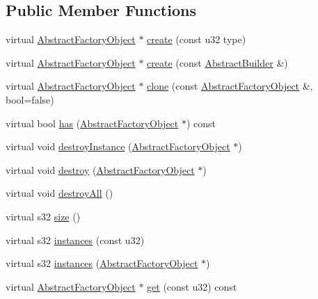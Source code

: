 \subsection*{Public Member Functions}
\begin{DoxyCompactItemize}
\item 
virtual \hyperlink{classjli_1_1_abstract_factory_object}{Abstract\+Factory\+Object} $\ast$ \hyperlink{classjli_1_1_world_factory_ae84dad80ebffaf34cdc7fe95d1e7a66e}{create} (const u32 type)
\item 
virtual \hyperlink{classjli_1_1_abstract_factory_object}{Abstract\+Factory\+Object} $\ast$ \hyperlink{classjli_1_1_world_factory_a7907b82e19f4bbb1f5c98fbceaf7d961}{create} (const \hyperlink{classjli_1_1_abstract_builder}{Abstract\+Builder} \&)
\item 
virtual \hyperlink{classjli_1_1_abstract_factory_object}{Abstract\+Factory\+Object} $\ast$ \hyperlink{classjli_1_1_world_factory_aadc177f52ddc2a0d53259ea99fbf90df}{clone} (const \hyperlink{classjli_1_1_abstract_factory_object}{Abstract\+Factory\+Object} \&, bool=false)
\item 
virtual bool \hyperlink{classjli_1_1_world_factory_a29af5f1c2a8f5e57c0dc4e9764715797}{has} (\hyperlink{classjli_1_1_abstract_factory_object}{Abstract\+Factory\+Object} $\ast$) const 
\item 
virtual void \hyperlink{classjli_1_1_world_factory_a715756195f93bfec6f6c54640e5e09e5}{destroy\+Instance} (\hyperlink{classjli_1_1_abstract_factory_object}{Abstract\+Factory\+Object} $\ast$)
\item 
virtual void \hyperlink{classjli_1_1_world_factory_ac40ef526c98ded68e2be556995147ca5}{destroy} (\hyperlink{classjli_1_1_abstract_factory_object}{Abstract\+Factory\+Object} $\ast$)
\item 
virtual void \hyperlink{classjli_1_1_world_factory_a17880329ad38799467c11830c8b2b39e}{destroy\+All} ()
\item 
virtual s32 \hyperlink{classjli_1_1_world_factory_a56279adb8ce6f7072739a5b7eeccd45b}{size} ()
\item 
virtual s32 \hyperlink{classjli_1_1_world_factory_a6305d49494b83a45f77c4065efe595d3}{instances} (const u32)
\item 
virtual s32 \hyperlink{classjli_1_1_world_factory_a352be79efeb80d15cf9e7c9cafc8d47a}{instances} (\hyperlink{classjli_1_1_abstract_factory_object}{Abstract\+Factory\+Object} $\ast$)
\item 
virtual \hyperlink{classjli_1_1_abstract_factory_object}{Abstract\+Factory\+Object} $\ast$ \hyperlink{classjli_1_1_world_factory_a44235d0cb9e7e11fa7df8b2c7c84e77b}{get} (const u32) const 

\end{DoxyCompactItemize}
